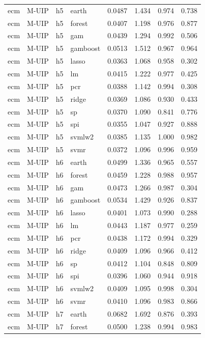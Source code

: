 \begin{ThreePartTable}
\begin{longtable}[t]{llclcccc}
\addlinespace
ecm & M-UIP & h5 & earth & 0.0487 & 1.434 & 0.974 & 0.738\\
ecm & M-UIP & h5 & forest & 0.0407 & 1.198 & 0.976 & 0.877\\
ecm & M-UIP & h5 & gam & 0.0439 & 1.294 & 0.992 & 0.506\\
ecm & M-UIP & h5 & gamboost & 0.0513 & 1.512 & 0.967 & 0.964\\
ecm & M-UIP & h5 & lasso & 0.0363 & 1.068 & 0.958 & 0.302\\
ecm & M-UIP & h5 & lm & 0.0415 & 1.222 & 0.977 & 0.425\\
ecm & M-UIP & h5 & pcr & 0.0388 & 1.142 & 0.994 & 0.308\\
ecm & M-UIP & h5 & ridge & 0.0369 & 1.086 & 0.930 & 0.433\\
ecm & M-UIP & h5 & sp & 0.0370 & 1.090 & 0.841 & 0.776\\
ecm & M-UIP & h5 & spi & 0.0355 & 1.047 & 0.927 & 0.888\\
ecm & M-UIP & h5 & svmlw2 & 0.0385 & 1.135 & 1.000 & 0.982\\
ecm & M-UIP & h5 & svmr & 0.0372 & 1.096 & 0.996 & 0.959\\
\addlinespace
ecm & M-UIP & h6 & earth & 0.0499 & 1.336 & 0.965 & 0.557\\
ecm & M-UIP & h6 & forest & 0.0459 & 1.228 & 0.988 & 0.957\\
ecm & M-UIP & h6 & gam & 0.0473 & 1.266 & 0.987 & 0.304\\
ecm & M-UIP & h6 & gamboost & 0.0534 & 1.429 & 0.926 & 0.837\\
ecm & M-UIP & h6 & lasso & 0.0401 & 1.073 & 0.990 & 0.288\\
ecm & M-UIP & h6 & lm & 0.0443 & 1.187 & 0.977 & 0.259\\
ecm & M-UIP & h6 & pcr & 0.0438 & 1.172 & 0.994 & 0.329\\
ecm & M-UIP & h6 & ridge & 0.0409 & 1.096 & 0.966 & 0.412\\
ecm & M-UIP & h6 & sp & 0.0412 & 1.104 & 0.848 & 0.809\\
ecm & M-UIP & h6 & spi & 0.0396 & 1.060 & 0.944 & 0.918\\
ecm & M-UIP & h6 & svmlw2 & 0.0409 & 1.095 & 0.998 & 0.304\\
ecm & M-UIP & h6 & svmr & 0.0410 & 1.096 & 0.983 & 0.866\\
\addlinespace
ecm & M-UIP & h7 & earth & 0.0682 & 1.692 & 0.876 & 0.393\\
ecm & M-UIP & h7 & forest & 0.0500 & 1.238 & 0.994 & 0.983\\

\end{longtable}
\end{ThreePartTable}
